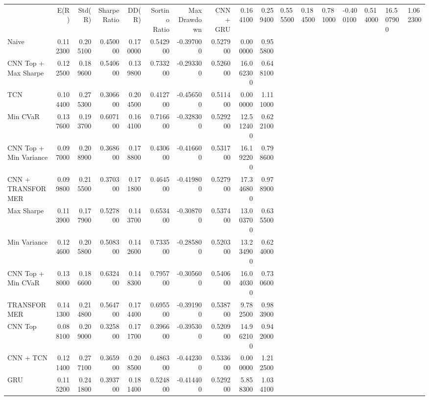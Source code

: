 \begin{tabular}{lrrrrrrrrr}
\toprule
 & E(R) & Std(R) & Sharpe Ratio & DD(R) & Sortino Ratio & Max Drawdown & %
\midrule
CNN + GRU & 0.164100 & 0.259400 & 0.555500 & 0.184500 & 0.781000 & -0.400100 & 0.514000 & 16.507900 & 1.062300 \\
Naive & 0.112300 & 0.205100 & 0.450000 & 0.170000 & 0.542900 & -0.397000 & 0.527900 & 0.000000 & 0.955800 \\
CNN Top + Max Sharpe & 0.122500 & 0.189600 & 0.540600 & 0.139800 & 0.733200 & -0.293300 & 0.526000 & 16.062300 & 0.648100 \\
TCN & 0.104400 & 0.275300 & 0.306600 & 0.204500 & 0.412700 & -0.456500 & 0.511400 & 0.000000 & 1.111000 \\
Min CVaR & 0.137600 & 0.193700 & 0.607100 & 0.164100 & 0.716600 & -0.328300 & 0.529200 & 12.512400 & 0.622100 \\
CNN Top + Min Variance & 0.097000 & 0.208900 & 0.368600 & 0.178800 & 0.430600 & -0.416600 & 0.531700 & 16.192200 & 0.798600 \\
CNN + TRANSFORMER & 0.099800 & 0.215500 & 0.370300 & 0.171800 & 0.464500 & -0.419800 & 0.527900 & 17.346800 & 0.978900 \\
Max Sharpe & 0.113900 & 0.177900 & 0.527800 & 0.143700 & 0.653400 & -0.308700 & 0.537400 & 13.003700 & 0.635500 \\
Min Variance & 0.124600 & 0.205800 & 0.508300 & 0.142600 & 0.733500 & -0.285800 & 0.520300 & 13.234900 & 0.624000 \\
CNN Top + Min CVaR & 0.138000 & 0.186600 & 0.632400 & 0.148300 & 0.795700 & -0.305600 & 0.540600 & 16.040300 & 0.730600 \\
TRANSFORMER & 0.141300 & 0.214800 & 0.564700 & 0.174400 & 0.695500 & -0.391900 & 0.538700 & 9.782500 & 0.983900 \\
CNN Top & 0.088100 & 0.209000 & 0.325800 & 0.171700 & 0.396600 & -0.395300 & 0.520900 & 14.962100 & 0.942000 \\
CNN + TCN & 0.121400 & 0.277100 & 0.365900 & 0.208500 & 0.486300 & -0.442300 & 0.533600 & 0.000000 & 1.212500 \\
GRU & 0.115200 & 0.241800 & 0.393700 & 0.181400 & 0.524800 & -0.414400 & 0.529200 & 5.858300 & 1.034100 \\
\bottomrule
\end{tabular}
